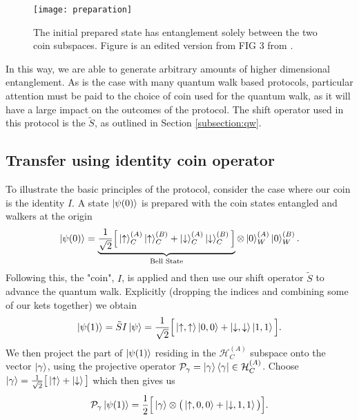 \begin{figure}
    \centering
    \texttt{[image: preparation]}
    \caption{The initial prepared state has entanglement solely between the two coin subspaces. Figure is an edited version from FIG 3 from \cite{giordani2020}.}
    \label{fig:preparation}
\end{figure}

In this way, we are able to generate arbitrary amounts of higher dimensional entanglement.
As is the case with many quantum walk based protocols, particular attention must be paid to the choice of coin used for the quantum walk, as it will have a large impact on the outcomes of the protocol.
The shift operator used in this protocol is the $\tilde{S}$, as outlined in Section \ref{subsection:qw}.

\subsection{Transfer using identity coin operator}
\label{subsection:qw_transfer}
To illustrate the basic principles of the protocol, consider the case where our coin is the identity $I$. A state $\ket{\psi(0)}$ is prepared with the coin states entangled and walkers at the origin
\begin{equation}
    \ket{\psi(0)} = \underbrace{\frac{1}{\sqrt{2}}\Big [\ket{\uparrow}^{(A)}_C\ket{\uparrow}^{(B)}_C + \ket{\downarrow}^{(A)}_C\ket{\downarrow}^{(B)}_C \Big]}_{\text{Bell State}}\otimes \ket{0}^{(A)}_W\ket{0}^{(B)}_W.
\end{equation}
Following this, the "coin", $I$, is applied and then use our shift operator $\tilde{S}$ to advance the quantum walk. Explicitly (dropping the indices and combining some of our kets together) we obtain
\begin{equation}
    \ket{\psi(1)} = \tilde{S}I\ket{\psi} = \frac{1}{\sqrt{2}}\Big [\ket{\uparrow,\uparrow}\ket{0,0} + \ket{\downarrow,\downarrow}\ket{1,1}\Big].
\end{equation}
We then project the part of $\ket{\psi(1)}$ residing in the $\mathcal{H}^{(A)}_C$ subspace onto the vector $\ket{\gamma}$, using the projective operator $\mathcal{P}_\gamma = \ket{\gamma}\bra{\gamma} \in \mathcal{H}^{(A)}_C$. Choose $\ket{\gamma} = \frac{1}{\sqrt{2}} \big [\ket{\uparrow} + \ket{\downarrow} \big]$ which then gives us
\begin{equation}
    \mathcal{P}_\gamma \ket{\psi(1)} = \frac{1}{2}\Big [\ket{\gamma}\otimes \big (\ket{\uparrow, 0, 0} + \ket{\downarrow, 1, 1}\big )\Big ].
\end{equation}
